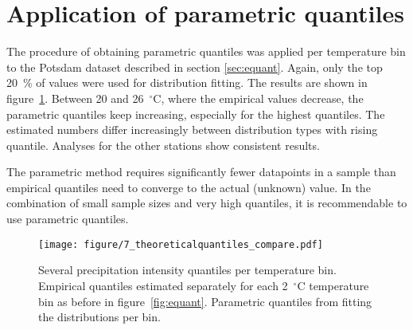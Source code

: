\documentclass[a4paper]{article}
\newcommand{\todo}[1]{\emph{\textcolor{red}{#1}}}
\begin{document}
\section{Application of parametric quantiles} %
\label{sec:paramquant}
\begin{multicols}{2}

The procedure of obtaining parametric quantiles was applied per temperature bin to the Potsdam dataset described in section \ref{sec:equant}.
Again, only the top 20~\% of values were used for distribution fitting.
The results are shown in figure~\ref{fig:tquant}.
Between 20 and 26~$^\circ$C, where the empirical values decrease, the parametric quantiles keep increasing, especially for the highest quantiles.
The estimated numbers differ increasingly between distribution types with rising quantile. 
Analyses for the other stations show consistent results.

The parametric method requires significantly fewer datapoints in a sample than empirical quantiles need to converge to the actual (unknown) value.
In the combination of small sample sizes and very high quantiles, it is recommendable to use parametric quantiles.




\end{multicols}
\begin{figure}[H] %
\texttt{[image: figure/7\_theoreticalquantiles\_compare.pdf]}
\caption[Parametric quantiles]{Several precipitation intensity quantiles per temperature bin. Empirical quantiles estimated separately for each 2~$^\circ$C temperature bin as before in figure~\ref{fig:equant}. Parametric quantiles from fitting the distributions per bin.}
\label{fig:tquant}
\end{figure}
\end{document}
